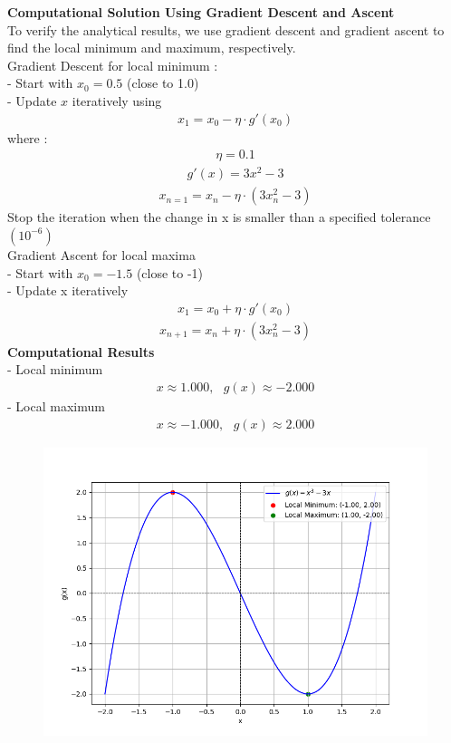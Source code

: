 \documentclass[journal]{IEEEtran}
\begin{document}
\textbf{Computational Solution Using Gradient Descent and Ascent}\\
To verify the analytical results, we use gradient descent and gradient ascent to find the local minimum and maximum, respectively.\\
Gradient Descent for local minimum : \\ 
 - Start with $x_0 = 0.5$ (close to 1.0)\\
 - Update $x$ iteratively using 
\begin{align}
    x_{1} = x_0 - \eta \cdot g'(x_0)
\end{align}
where :
\begin{align}
    \eta = 0.1 
\end{align}
\begin{align}
    g'(x) = 3x^2 - 3 
\end{align}
\begin{align}
    x_{n=1} = x_n - \eta \cdot (3x_n^2 -3)
\end{align}
Stop the iteration when the change in x is smaller than a specified tolerance $(10^{-6})$\\
Gradient Ascent for local maxima \\
- Start with $x_0 = - 1.5$ (close to -1)\\
- Update x iteratively 
\begin{align}
  x_1 = x_0 + \eta \cdot g'(x_0)
\end{align}
\begin{align}
    x_{n+1} = x_n + \eta\cdot(3x_n^2-3)
\end{align}
\textbf{Computational Results} \\
 - Local minimum 
 \begin{align}
     x \approx 1.000,\text{ } g(x) \approx -2.000
 \end{align} 
- Local maximum
\begin{align}
    x \approx -1.000 , \text{ }g(x)  \approx 2.000
\end{align}
\begin{figure}
    \centering
    \includegraphics[width=\columnwidth]{figs/Figure_1.png}
\end{figure}
\end{document}
